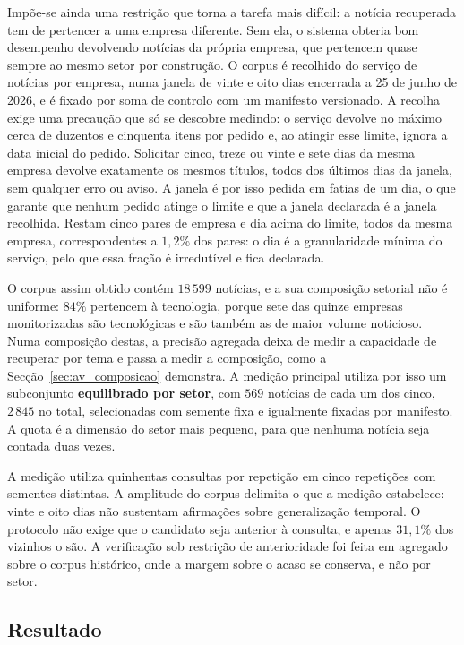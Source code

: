 Impõe-se ainda uma restrição que torna a tarefa mais difícil: a notícia recuperada tem de pertencer a
uma empresa diferente. Sem ela, o sistema obteria bom desempenho devolvendo notícias da própria
empresa, que pertencem quase sempre ao mesmo setor por construção. O corpus é recolhido do serviço de notícias por empresa, numa janela de vinte e oito dias
encerrada a 25 de junho de 2026, e é fixado por soma de controlo com um manifesto versionado. A
recolha exige uma precaução que só se descobre medindo: o serviço devolve no máximo cerca de
duzentos e cinquenta itens por pedido e, ao atingir esse limite, ignora a data inicial do pedido.
Solicitar cinco, treze ou vinte e sete dias da mesma empresa devolve exatamente os mesmos
títulos, todos dos últimos dias da janela, sem qualquer erro ou aviso. A janela é por isso
pedida em fatias de um dia, o que garante que nenhum pedido atinge o limite e que a janela
declarada é a janela recolhida. Restam cinco pares de empresa e dia acima do limite, todos da
mesma empresa, correspondentes a $1{,}2\%$ dos pares: o dia é a granularidade mínima do serviço,
pelo que essa fração é irredutível e fica declarada.

O corpus assim obtido contém $18\,599$ notícias, e a sua composição setorial não é uniforme: $84\%$
pertencem à tecnologia, porque sete das quinze empresas monitorizadas são tecnológicas e são
também as de maior volume noticioso. Numa composição destas, a precisão agregada deixa de medir a
capacidade de recuperar por tema e passa a medir a composição, como a
Secção~\ref{sec:av_composicao} demonstra. A medição principal utiliza por isso um subconjunto
\textbf{equilibrado por setor}, com $569$ notícias de cada um dos cinco, $2\,845$ no total,
selecionadas com semente fixa e igualmente fixadas por manifesto. A quota é a dimensão do setor
mais pequeno, para que nenhuma notícia seja contada duas vezes.

A medição utiliza quinhentas consultas por repetição em cinco repetições com sementes distintas. A
amplitude do corpus delimita o que a medição estabelece: vinte e oito dias não sustentam
afirmações sobre generalização temporal. O protocolo não exige que o candidato seja anterior à consulta, e apenas $31{,}1\%$ dos vizinhos o
são. A verificação sob restrição de anterioridade foi feita em agregado sobre o corpus histórico, onde a
margem sobre o acaso se conserva, e não por setor.

\subsection{Resultado}

